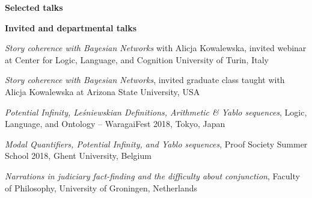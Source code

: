 \documentclass[10pt, a4paper]{article}
\newcommand{\years}[1]{\marginnote{\normalsize #1}}
\begin{document}


\vspace{0.5mm}







\vspace{0.5mm}

\years{2011}




\vspace{2mm}

\pagebreak


\large {\sc \textbf{Selected talks}}\normalsize

\setlength{\emergencystretch}{3em}



\vspace{1mm}


 {\sc \textbf{Invited and departmental talks}}\normalsize

\noindent

\vspace{1.5mm}

\years{2021}

\emph{Story coherence with Bayesian Networks} with Alicja Kowalewska, invited webinar at Center for Logic, Language, and Cognition University of Turin, Italy


\emph{Story coherence with Bayesian Networks}, invited graduate class taught with Alicja Kowalewska at Arizona State University, USA



\years{2018}

\emph{Potential Infinity, Le\' sniewskian Definitions, Arithmetic \& Yablo sequences}, Logic, Language, and Ontology -- WaragaiFest 2018, Tokyo, Japan

\vspace{0.5mm}


\emph{Modal Quantifiers, Potential Infinity, and Yablo sequences}, Proof Society Summer School 2018, Ghent University, Belgium

\vspace{0.5mm}

\years{2017} \emph{Narrations in judiciary fact-finding
and the difficulty about conjunction}, Faculty of Philosophy, University of Groningen, Netherlands
\end{document}
